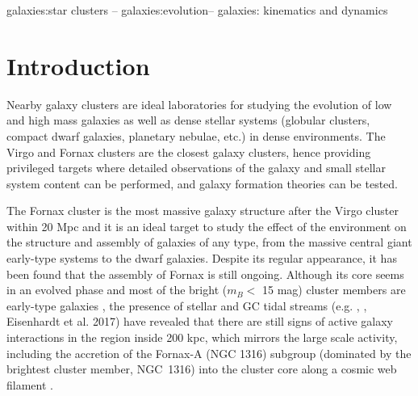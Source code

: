 \documentclass[useAMS,usenatbib]{mn2e}
\begin{document}
\begin{keywords}
galaxies:star clusters -- galaxies:evolution-- galaxies: kinematics and dynamics
\end{keywords}

\section{Introduction}

Nearby galaxy clusters are ideal laboratories for studying the evolution of 
low and high mass galaxies as well as dense stellar systems (globular 
clusters, compact dwarf galaxies, planetary nebulae, etc.) in dense environments. 
The Virgo and Fornax clusters are the closest galaxy clusters, hence providing 
privileged targets where detailed observations of the galaxy and small stellar 
system content can be performed, and galaxy formation theories can be tested. 

The Fornax cluster is the most massive galaxy structure after the Virgo cluster 
within 20 Mpc and it is an ideal target to study the effect of the environment 
on the structure and assembly of galaxies of any type, from the massive central 
giant early-type systems to the dwarf galaxies. Despite its regular appearance, 
it has been found that the assembly of Fornax is still ongoing. 
Although its core seems in an evolved phase \citep{Grillmair94,Jordan07} 
and most of the bright ($m_B < $  15 mag) cluster members are 
early-type galaxies \citep{Ferguson89}, the presence of stellar and GC tidal 
streams (e.g. \citealt{Iodice16}, \citealt{DAbrusco16}, Eisenhardt et al. 
2017) have revealed that there are still signs of active galaxy interactions in 
the region inside 200 kpc, which mirrors the large scale activity, including 
the accretion of the Fornax-A (NGC 1316) subgroup (dominated by the brightest 
cluster member, NGC~1316) into the cluster core along a 
cosmic web filament \citep{Drinkwater00,Scharf05}.
\end{document}
